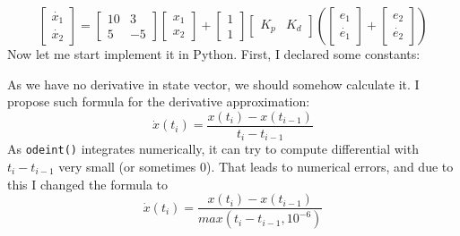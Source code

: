 \documentclass[a4paper,12pt]{article}
\begin{document}
    \begin{equation*}
        \begin{bmatrix}
            \dot{x_1}\\
            \dot{x_2}
        \end{bmatrix}
        = 
        \begin{bmatrix}
            10 & 3 \\
            5 & -5
        \end{bmatrix}
        \begin{bmatrix}
            x_1\\
            x_2
        \end{bmatrix}
        +
        \begin{bmatrix}
            1 \\
            1
        \end{bmatrix}
        \begin{bmatrix}
            K_p & K_d
        \end{bmatrix}
        \left(
            \begin{bmatrix}
                e_1\\
                \dot{e_1}
            \end{bmatrix}
            +
            \begin{bmatrix}
                e_2\\
                \dot{e_2}
            \end{bmatrix}
        \right)
    \end{equation*}
    Now let me start implement it in Python. First, I declared some constants:
    
    As we have no derivative in state vector, we should somehow calculate it. I 
    propose such formula for the derivative approximation:
    \begin{equation*}
        \dot x(t_i) = \frac{x(t_i) - x(t_{i-1})}{t_i - t_{i-1}}
    \end{equation*}
    As \texttt{odeint()} integrates numerically, it can try to compute differential
    with $t_i - t_{i-1}$ very small (or sometimes 0). That leads to numerical errors, and due to this
    I changed the formula to 
    \begin{equation*}
        \dot x(t_i) = \frac{x(t_i) - x(t_{i-1})}{max(t_i - t_{i-1}, 10^{-6})}
    \end{equation*}
        
\end{document}
